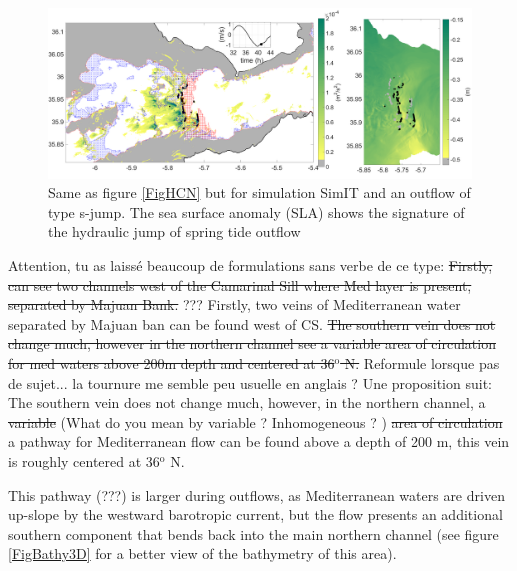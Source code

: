 \begin{figure}[!h]
 \centering
\includegraphics[width=\linewidth]{./GBR3D/IES_41h_p.png}
 \caption {Same as figure  \ref{FigHCN} but for simulation SimIT and an outflow of type {s-jump}. The sea surface anomaly (SLA) shows the signature of the hydraulic jump of spring tide outflow}
 \label{FigHCI}
\end{figure}

\color{green}Attention, tu as laissé beaucoup de formulations sans verbe de ce type: 
\sout{Firstly, can see two channels west of the Camarinal Sill where Med layer is present, separated by Majuan Bank.} ???\color{black}
\color{blue}Firstly, two veins of Mediterranean water separated by Majuan ban can be found west of CS.
 \sout{The southern vein does not change much, however in the northern channel see a variable area of circulation for med waters above 200m depth and centered at 36$^\text{o}$ N.} \color{green}Reformule lorsque pas de sujet... la tournure me semble peu usuelle en anglais ? Une proposition suit:\\
 \color{blue}
The southern vein does not change much, however, in the northern channel, a  \sout{variable}  \color{green} (What do you mean by variable ? Inhomogeneous ? )\color{blue}  \sout{area of circulation} a pathway for Mediterranean flow can be found above a depth of 200 m, this vein is roughly centered at 36$^\text{o}$ N. \color{black}

This pathway (???) is larger during outflows, as Mediterranean waters are driven up-slope by the westward barotropic current, but \color{blue} the flow presents an additional \color{black} southern component that bends back into the main northern channel (see figure \ref{FigBathy3D} for a better view of the bathymetry of this area).

